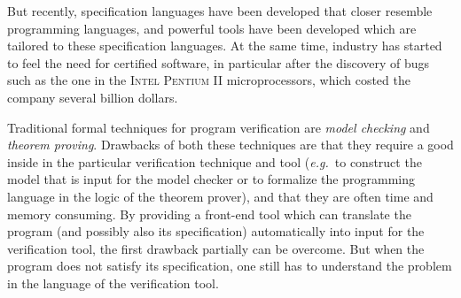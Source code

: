 \documentclass[a4paper]{llncs}
\begin{document}
But recently, specification languages have been developed that closer
resemble programming languages, and powerful tools have been developed
which are tailored to these specification languages. At the same time,
industry has started to feel the need for certified software, in
particular after the discovery of bugs such as the one in the
\textsc{Intel} \textsc{Pentium II} microprocessors, which costed the
company several billion dollars.



Traditional formal techniques for program verification 
are \textit{model checking} and
\textit{theorem proving}. Drawbacks of both these
techniques are that they require a good inside in the particular
verification technique and tool (\emph{e.g.}~to construct the model
that is input for the model checker or to formalize the programming
language in the logic of the theorem prover), and that they are often
time and memory consuming. By providing a front-end tool which can
translate the program (and possibly also its specification)
automatically into input for the verification tool, the first drawback
partially can be overcome. But when the program does not satisfy its
specification, one still has to understand the problem in the language of
the verification tool.


\end{document}
